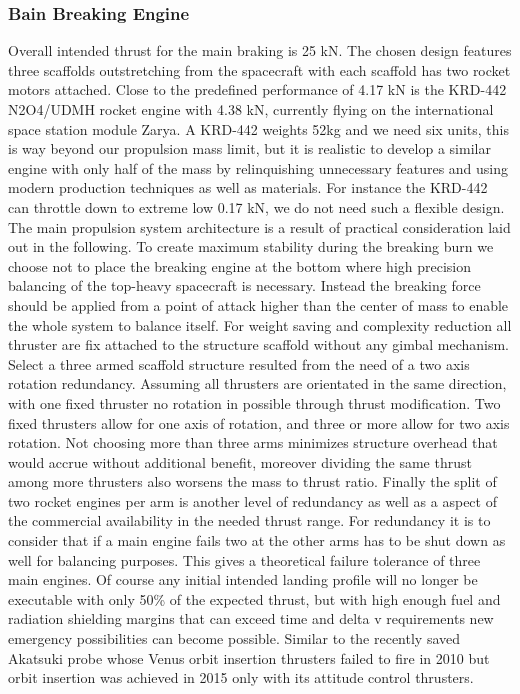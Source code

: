 \subsubsection{Bain Breaking Engine} 
Overall intended thrust for the main braking is 25 kN. The chosen design features three scaffolds outstretching from the spacecraft with each scaffold has two rocket motors attached. Close to the predefined performance of 4.17 kN is the KRD-442 \cite{AstronauticaKRD} N2O4/UDMH rocket engine with 4.38 kN, currently flying on the international space station module Zarya. A KRD-442 weights 52kg and we need six units, this is way beyond our propulsion mass limit, but it is realistic to develop a similar engine with only half of the mass by relinquishing unnecessary features and using modern production techniques as well as materials. For instance the KRD-442 can throttle down to extreme low 0.17 kN, we do not need such a flexible design.\\
The main propulsion system architecture is a result of practical consideration laid out in the following. To create maximum stability during the breaking burn we choose not to place the breaking engine at the bottom where high precision balancing of the top-heavy spacecraft is necessary. Instead the breaking force should be applied from a point of attack higher than the center of mass to enable the whole system to balance itself. For weight saving and complexity reduction all thruster are fix attached to the structure scaffold without any gimbal mechanism. Select a three armed scaffold structure resulted from the need of a two axis rotation redundancy. Assuming all thrusters are orientated in the same direction, with one fixed thruster no rotation in possible through thrust modification. Two fixed thrusters allow for one axis of rotation, and three or more allow for two axis rotation. Not choosing more than three arms minimizes structure overhead that would accrue without additional benefit, moreover dividing the same thrust among more thrusters also worsens the mass to thrust ratio. Finally the split of two rocket engines per arm is another level of redundancy as well as a aspect of the commercial availability in the needed thrust range. For redundancy it is to consider that if a main engine fails two at the other arms has to be shut down as well for balancing purposes. This gives a theoretical failure tolerance of three main engines. Of course any initial intended landing profile will no longer be executable with only 50\% of the expected thrust, but with high enough fuel and radiation shielding margins that can exceed time and delta v requirements new emergency possibilities can become possible. Similar to the recently saved Akatsuki \cite{AkatsukiRescue} probe whose Venus orbit insertion thrusters failed to fire in 2010 but orbit insertion was achieved in 2015 only with its attitude control thrusters.\\

